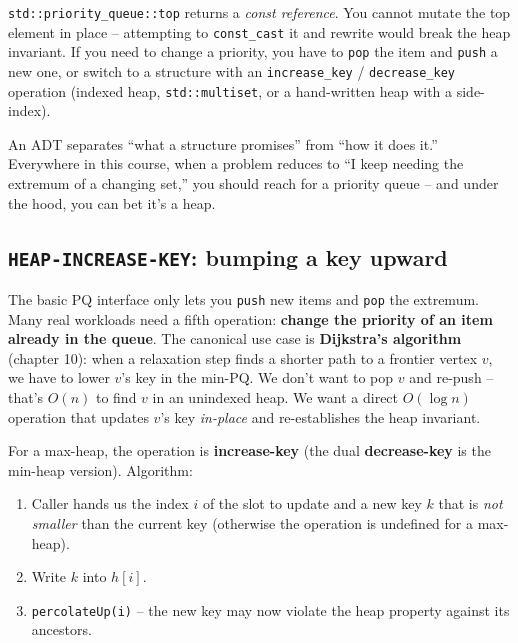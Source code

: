 \documentclass[11pt]{article}
\begin{document}
\begin{warnbox}
\texttt{std::priority\_queue::top} returns a \emph{const reference}. You cannot mutate the top element in place -- attempting to \texttt{const\_cast} it and rewrite would break the heap invariant. If you need to change a priority, you have to \texttt{pop} the item and \texttt{push} a new one, or switch to a structure with an \texttt{increase\_key} / \texttt{decrease\_key} operation (indexed heap, \texttt{std::multiset}, or a hand-written heap with a side-index).
\end{warnbox}

\begin{ideabox}
An ADT separates ``what a structure promises'' from ``how it does it.'' Everywhere in this course, when a problem reduces to ``I keep needing the extremum of a changing set,'' you should reach for a priority queue -- and under the hood, you can bet it's a heap.
\end{ideabox}

\subsection*{\texttt{HEAP-INCREASE-KEY}: bumping a key upward}

The basic PQ interface only lets you \texttt{push} new items and
\texttt{pop} the extremum. Many real workloads need a fifth operation:
\textbf{change the priority of an item already in the queue}. The
canonical use case is \textbf{Dijkstra's algorithm} (chapter 10):
when a relaxation step finds a shorter path to a frontier vertex
$v$, we have to lower $v$'s key in the min-PQ. We don't want to pop
$v$ and re-push -- that's $O(n)$ to find $v$ in an unindexed heap.
We want a direct $O(\log n)$ operation that updates $v$'s key
\emph{in-place} and re-establishes the heap invariant.

For a max-heap, the operation is \textbf{increase-key} (the dual
\textbf{decrease-key} is the min-heap version). Algorithm:

\begin{enumerate}[leftmargin=*]
    \item Caller hands us the index $i$ of the slot to update and a
          new key $k$ that is \emph{not smaller} than the current
          key (otherwise the operation is undefined for a max-heap).
    \item Write $k$ into $h[i]$.
    \item \texttt{percolateUp(i)} -- the new key may now violate the
          heap property against its ancestors.
\end{enumerate}
\end{document}
